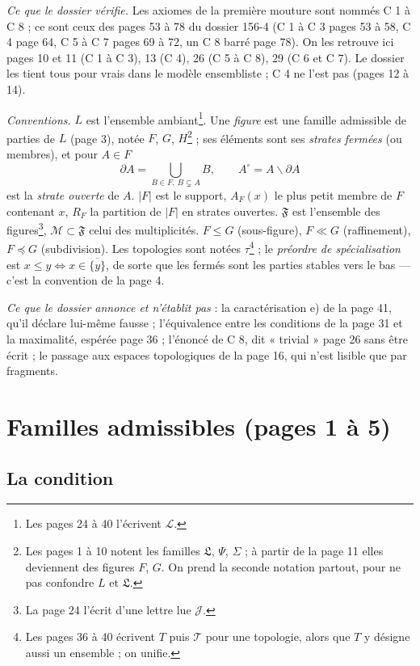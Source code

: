 \documentclass[11pt,a4paper]{article}
\begin{document}
\emph{Ce que le dossier vérifie.} Les axiomes de la première mouture sont
nommés C 1 à C 8 ; ce sont ceux des pages 53 à 78 du dossier 156-4 (C 1 à C 3
pages 53 à 58, C 4 page 64, C 5 à C 7 pages 69 à 72, un C 8 barré page 78). On
les retrouve ici pages 10 et 11 (C 1 à C 3), 13 (C 4), 26 (C 5 à C 8), 29 (C 6
et C 7). Le dossier les tient tous pour vrais dans le modèle ensembliste ; C 4
ne l'est pas (pages 12 à 14).

\emph{Conventions.} $L$ est l'ensemble ambiant\footnote{Les pages 24 à 40
l'écrivent $\mathcal{L}$.}. Une \emph{figure} est une famille admissible de
parties de $L$ (page 3), notée $F$, $G$, $H$\footnote{Les pages 1 à 10 notent
les familles $\mathfrak{L}$, $\Psi$, $\Sigma$ ; à partir de la page 11 elles
deviennent des figures $F$, $G$. On prend la seconde notation partout, pour ne
pas confondre $L$ et $\mathfrak{L}$.} ; ses éléments sont ses \emph{strates
fermées} (ou membres), et pour $A \in F$
\[
\partial A = \bigcup_{B \in F,\ B \subsetneq A} B, \qquad A^{\circ} = A
\smallsetminus \partial A
\]
est la \emph{strate ouverte} de $A$. $|F|$ est le support, $A_{F}(x)$ le plus
petit membre de $F$ contenant $x$, $R_{F}$ la partition de $|F|$ en strates
ouvertes. $\mathfrak{F}$ est l'ensemble des figures\footnote{La page 24 l'écrit
d'une lettre lue $\mathcal{J}$.}, $\mathcal{M} \subset \mathfrak{F}$ celui des
multiplicités. $F \leq G$ (sous-figure), $F \ll G$ (raffinement), $F
\preccurlyeq G$ (subdivision). Les topologies sont notées $\tau$\footnote{Les
pages 36 à 40 écrivent $T$ puis $\mathcal{T}$ pour une topologie, alors que $T$
y désigne aussi un ensemble ; on unifie.} ; le \emph{préordre de
spécialisation} est $x \leq y \iff x \in \overline{\{y\}}$, de sorte que les
fermés sont les parties stables vers le bas --- c'est la convention de la
page 4.

\emph{Ce que le dossier annonce et n'établit pas} : la caractérisation e) de la
page 41, qu'il déclare lui-même fausse ; l'équivalence entre les conditions de
la page 31 et la maximalité, espérée page 36 ; l'énoncé de C 8, dit
« trivial » page 26 sans être écrit ; le passage aux espaces topologiques de la
page 16, qui n'est lisible que par fragments.

\section*{Familles admissibles (pages 1 à 5)}

\subsection*{La condition}
\end{document}
